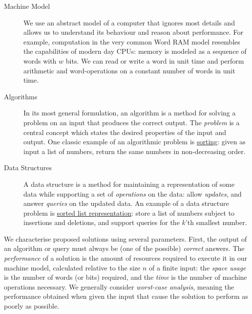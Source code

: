 \begin{description}
    \item[Machine Model] We use an abstract model of a computer that ignores most details and allows us to understand its behaviour and reason about performance.
    For example, computation in the very common Word RAM model resembles the capabilities of modern day CPUs: memory is modeled as a sequence of words with $w$ bits. We can read or write a word in unit time and perform arithmetic and word-operations on a constant number of words in unit time.
    \item[Algorithms] In its most general formulation, an algorithm is a method for solving a problem on an input that produces the correct output. 
    The \emph{problem} is a central concept which states the desired properties of the input and output.
    One classic example of an algorithmic problem is \underline{sorting}: given as input a list of numbers, return the same numbers in non-decreasing order.
    \item[Data Structures] A data structure is a method for maintaining a representation of some data while supporting a set of \emph{operations} on the data: allow \emph{updates}, and answer \emph{queries} on the updated data. 
    An example of a data structure problem is \underline{sorted list representation}: store a list of numbers subject to insertions and deletions, and support queries for the $k$'th smallest number.
\end{description}

We characterise proposed solutions using several parameters.
First, the output of an algorithm or query must always be (one of the possible) \emph{correct} answers.
The \emph{performance} of a solution is the amount of resources required to execute it in our machine model, calculated relative to the size $n$ of a finite input: the \emph{space usage} is the number of words (or bits) required, and the \emph{time} is the number of machine operations necessary. We generally consider \emph{worst-case analysis}, meaning the performance obtained when given the input that cause the solution to perform as poorly as possible.

